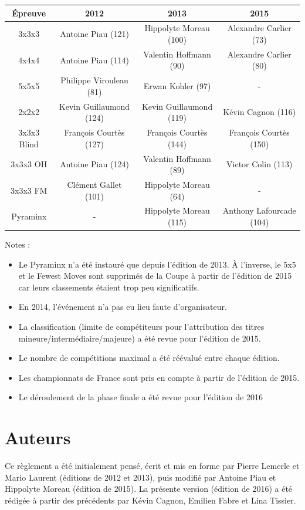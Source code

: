 \documentclass[10pt,a4paper]{article}
\newcommand{\3}{$3\times3$}
\newcommand{\4}{$4\times4$}
\newcommand{\2}{$2\times2$}
\begin{document}
\begin{table}[h]
\begin{center}
\begin{tabular}{|c|c|c|c|}
\hline
Épreuve & 2012 & 2013 & 2015 \\
\hline
3x3x3 & Antoine Piau (121) & Hippolyte Moreau (100) & Alexandre Carlier (73) \\
4x4x4 & Antoine Piau (114) & Valentin Hoffmann (90) & Alexandre Carlier (80) \\
5x5x5 & Philippe Virouleau (81) & Erwan Kohler (97) & - \\
2x2x2 & Kevin Guillaumond (124) & Kevin Guillaumond (119) & Kévin Cagnon (116) \\
3x3x3 Blind & François Courtès (127) & François Courtès (144) & François Courtès (150) \\
3x3x3 OH & Antoine Piau (124) & Valentin Hoffmann (89) & Victor Colin (113) \\
3x3x3 FM & Clément Gallet (101) & Hippolyte Moreau (64) & - \\
Pyraminx & - & Hippolyte Moreau (115) & Anthony Lafourcade (104) \\
\hline
\end{tabular}
\end{center}
\end{table}

Notes : 
\begin{itemize}
\item Le Pyraminx n'a été instauré que depuis l'édition de 2013. À l'inverse, le 5x5 et le Fewest Moves sont supprimés de la Coupe à partir de l'édition de 2015 car leurs classements étaient trop peu significatifs. 
\item En 2014, l'événement n'a pas eu lieu faute d'organisateur. 
\item La classification (limite de compétiteurs pour l'attribution des titres mineure/intermédiaire/majeure) a été revue pour l'édition de 2015.
\item Le nombre de compétitions maximal a été réévalué entre chaque édition.
\item Les championnats de France sont pris en compte à partir de l'édition de 2015.
\item Le déroulement de la phase finale a été revue pour l'édition de 2016
\end{itemize}

\section{Auteurs}
Ce règlement a été initialement pensé, écrit et mis en forme par Pierre Lemerle et Mario Laurent (éditions de 2012 et 2013), puis modifié par Antoine Piau et Hippolyte Moreau (édition de 2015). La présente version (édition de 2016) a été rédigée à partir des précédents par Kévin Cagnon, Emilien Fabre et Lina Tissier.
%
%
%
\end{document}
